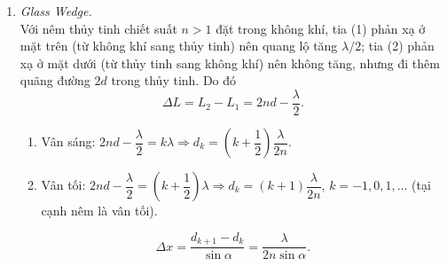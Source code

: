 \begin{enumerate}
\item \textit{Glass Wedge.}\\
Với nêm thủy tinh chiết suất $n > 1$ đặt trong không khí, tia (1) phản xạ ở mặt trên (từ không khí sang thủy tinh) nên quang lộ tăng $\lambda/2$; tia (2) phản xạ ở mặt dưới (từ thủy tinh sang không khí) nên không tăng, nhưng đi thêm quãng đường $2d$ trong thủy tinh. Do đó
\[
\Delta L = L_2 - L_1 = 2nd - \frac{\lambda}{2}.
\]
\begin{enumerate}
  \item[(a)] Vân sáng: $2nd - \dfrac{\lambda}{2} = k\lambda \Rightarrow d_k = \left(k + \dfrac12\right)\dfrac{\lambda}{2n}$.
  \item[(b)] Vân tối: $2nd - \dfrac{\lambda}{2} = \left(k + \dfrac12\right)\lambda \Rightarrow d_k = (k + 1)\dfrac{\lambda}{2n}$, $k = -1, 0, 1, \dots$ (tại cạnh nêm là vân tối).
\end{enumerate}
\[
\Delta x = \frac{d_{k+1} - d_k}{\sin\alpha} = \frac{\lambda}{2n\sin\alpha}.
\]


\end{enumerate}
